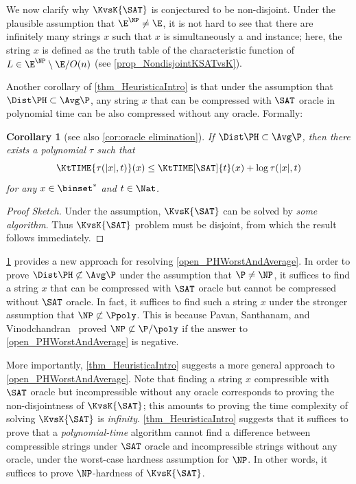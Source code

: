 \documentclass[11pt]{article}
\numberwithin{equation}{section}
\newtheorem{corollary}[theorem]{Corollary}
\theoremstyle{definition}
\theoremstyle{plain}
\begin{document}
We now clarify why $\KvsK{\SAT}$ is conjectured to be non-disjoint.
Under the plausible assumption that $\E^\NP \neq \E$,
it is not hard to see that
there are infinitely many strings $x$ such that $x$ is simultaneously a \Yes and \No instance;
here, the string $x$ is defined as the truth table of the characteristic function of $L \in \E^\NP \setminus \E/O(n)$
(see \cref{prop_NondisjointKSATvsK}).


Another corollary of \cref{thm_HeuristicaIntro} is
that
under the assumption that $\Dist\PH \subset \Avg\P$,
any string $x$ that can be compressed with $\SAT$ oracle in polynomial time
can be also compressed without any oracle.
Formally:
\begin{corollary}
  [see also \cref{cor:oracle elimination}]
  \label{cor_KandKSAT}
  If $\Dist\PH \subset \Avg\P$,
  then
  there exists a polynomial $\tau$ such that
  $$\KtTIME{\tau(|x|, t)}(x) \le \KtTIME[\SAT]{t}(x) + \log \tau(|x|, t)$$
  for any $x \in \binset^*$ and $t \in \Nat$.
\end{corollary}
\begin{proof}
  [Proof Sketch]
  Under the assumption, $\KvsK{\SAT}$
  can be solved by \emph{some algorithm}.
  Thus $\KvsK{\SAT}$ problem must be disjoint, from which the result follows immediately.
\end{proof}

%
%
%
\cref{cor_KandKSAT} provides a new approach for resolving \cref{open_PHWorstAndAverage}.
In order to prove $\Dist\PH \not\subset \Avg\P$ under the assumption that $\P \neq \NP$,
it suffices to find a string $x$ that can be compressed with $\SAT$ oracle
but cannot be compressed without $\SAT$ oracle.
In fact, it suffices to find such a string $x$ under the stronger assumption that $\NP \not\subset \Ppoly$.
%
%
%
%
This is because Pavan, Santhanam, and Vinodchandran~\cite{PavanSV06_fsttcs_conf}
proved
$\NP \not\subset \P/\poly$ if
%
%
the answer to \cref{open_PHWorstAndAverage} is negative.  %

More importantly, \cref{thm_HeuristicaIntro} suggests a more general approach to \cref{open_PHWorstAndAverage}.
%
Note that finding a string $x$ compressible with $\SAT$ oracle but incompressible
without any oracle
corresponds to proving the non-disjointness of $\KvsK{\SAT}$;
this amounts to proving
the time complexity of solving $\KvsK{\SAT}$
is \emph{infinity}.
\cref{thm_HeuristicaIntro}
suggests that
it suffices to prove that
a \emph{polynomial-time} algorithm cannot find a difference between
compressible strings under $\SAT$ oracle
and
incompressible strings without any oracle,
under the worst-case hardness assumption for $\NP$.
In other words, %
it suffices to prove $\NP$-hardness of $\KvsK{\SAT}$.
\end{document}
